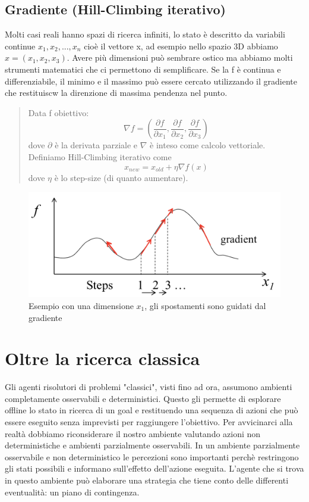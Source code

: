 \documentclass{article}
\begin{document}
\subsection{Gradiente (Hill-Climbing iterativo)}
Molti casi reali hanno spazi di ricerca infiniti, lo stato è descritto da variabili continue $x_1, x_2, ..., x_n$ cioè il vettore x, ad esempio nello spazio 3D abbiamo $x=(x_1,x_2,x_3)$. Avere più dimensioni può sembrare ostico ma abbiamo molti strumenti matematici che ci permettono di semplificare. \newline
Se la f è continua e differenziabile, il minimo e il massimo può essere cercato utilizzando il gradiente che restituiscw la direnzione di massima pendenza nel punto.
\begin{quote}
    Data f obiettivo:
    \[
    \nabla f = (\frac{\partial f}{\partial x_1}, \frac{\partial f}{\partial x_2}, \frac{\partial f}{\partial x_3})
    \] \newline dove $\partial$ è la derivata parziale e $\nabla$ è inteso come calcolo vettoriale. \newline
    Definiamo Hill-Climbing iterativo come
    \[
        x_{new} = x_{old} + \eta \nabla f(x)
    \]
    dove $\eta$ è lo step-size (di quanto aumentare).
\end{quote}
\begin{figure}[H]
    \centering
    \includegraphics[scale=0.5]{Images/gradient.png}
    \caption{Esempio con una dimensione $x_1$, gli spostamenti sono guidati dal gradiente}
\end{figure}

\clearpage

\section{Oltre la ricerca classica}
Gli agenti risolutori di problemi "classici", visti fino ad ora, assumono ambienti completamente osservabili e deterministici. Questo gli permette di esplorare offline lo stato in ricerca di un goal e restituendo una sequenza di azioni che può essere eseguito senza imprevisti per raggiungere l'obiettivo. Per avvicinarci alla realtà dobbiamo riconsiderare il nostro ambiente valutando azioni non deterministiche e ambienti parzialmente osservabili. \newline
In un ambiente parzialmente osservabile e non deterministico le percezioni sono importanti perchè restringono gli stati possibili e informano sull'effetto dell'azione eseguita. L'agente che si trova in questo ambiente può elaborare una strategia che tiene conto delle differenti eventualità: un piano di contingenza.
\end{document}
